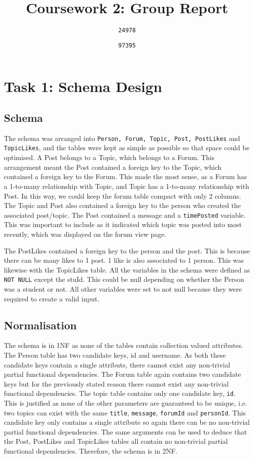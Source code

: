 \documentclass{article}
\begin{document}
\author{
	\texttt{24978}
	\and
	\texttt{97395}
}
\title{Coursework 2: Group Report}
\maketitle

\section*{Task 1: Schema Design}

\subsection*{Schema}

The schema was arranged into \texttt{Person, Forum, Topic, Post, PostLikes} and \texttt{TopicLikes}, and the tables were kept as simple as possible so that space could be optimised.
A Post belongs to a Topic, which belongs to a Forum. This arrangement meant the Post contained a foreign key to the Topic, which contained a foreign key to the Forum. This made the most sense, as a Forum has a 1-to-many relationship with Topic, and Topic has a 1-to-many relationship with Post. In this way, we could keep the forum table compact with only 2 columns.
The Topic and Post also contained a foreign key to the person who created the associated post/topic.
The Post contained a message and a \texttt{timePosted} variable. This was important to include as it indicated which topic was posted into most recently, which was displayed on the forum view page.

The PostLikes contained a foreign key to the person and the post. This is because there can be many likes to 1 post. 1 like is also associated to 1 person.
This was likewise with the TopicLikes table.
All the variables in the schema were defined as \texttt{NOT NULL} except the stuId. This could be null depending on whether the Person was a student or not. All other variables were set to not null because they were required to create a valid input.


\subsection*{Normalisation}

The schema is in 1NF as none of the tables contain collection valued attributes. 
The Person table has two candidate keys, id and username. As both these candidate keys contain a single attribute, there cannot exist any non-trivial partial functional dependencies. The Forum table again contains two candidate keys but for the previously stated reason there cannot exist any non-trivial functional dependencies. The topic table contains only one candidate key, \texttt{id}. This is justified as none of the other parameters are guaranteed to be unique, i.e. two topics can exist with the same \texttt{title}, \texttt{message}, \texttt{forumId} and \texttt{personId}. This candidate key only contains a single attribute so again there can be no non-trivial partial functional dependencies. The same arguments can be used to deduce that the Post, PostLikes and TopicLikes tables all contain no non-trivial partial functional dependencies. Therefore, the schema is in 2NF.
\end{document}
